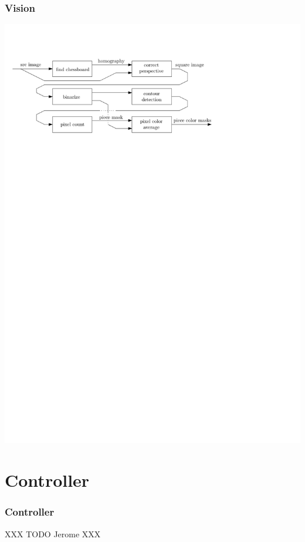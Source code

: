 \documentclass[t]{beamer}
\begin{document}
\begin{frame}[fragile]
\frametitle{Vision}

\vfill

\includegraphics[scale=0.8]{figures/diagram}

\vfill

\end{frame}


\section{Controller}

\begin{frame}[fragile]
\frametitle{Controller}

XXX TODO Jerome XXX

\end{frame}
\end{document}
